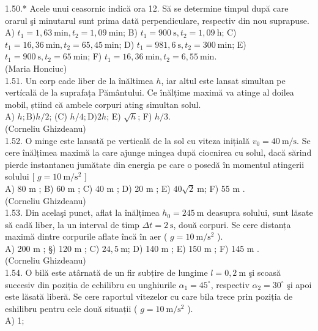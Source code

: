 \documentclass[10pt]{article}
\begin{document}
1.50.* Acele unui ceasornic indică ora 12. Să se determine timpul după care orarul şi minutarul sunt prima dată perpendiculare, respectiv din nou suprapuse.\\ A) $t_{1}=1,63 \mathrm{~min} , t_{2}=1,09 \mathrm{~min}$; B) $t_{1}=900 \mathrm{~s} , t_{2}=1,09 \mathrm{~h}$; C) $t_{1}=16,36 \mathrm{~min} , t_{2}=65,45 \mathrm{~min}$; D) $t_{1}=981,6 \mathrm{~s} , t_{2}=300 \mathrm{~min}$; E) $t_{1}=900 \mathrm{~s} , t_{2}=65 \mathrm{~min}$; F) $t_{1}=16,36 \mathrm{~min} , t_{2}=6,55 \mathrm{~min}$.\\ (Maria Honciuc)\\

1.51. Un corp cade liber de la înăltimea $h$, iar altul este lansat simultan pe vertícală de la suprafața Pământului. Ce înălțime maximă va atinge al doilea mobil, știind că ambele corpuri ating simultan solul.\\
A) $h ; \mathrm{B}) h / 2$; (C) $h / 4 ; \mathrm{D}) 2 h$; E) $\sqrt{h}$; F) $h / 3$.\\
(Corneliu Ghizdeanu)\\
1.52. O minge este lansată pe verticală de la sol cu viteza inițială $v_{0}=40 \mathrm{~m} / \mathrm{s}$. Se cere înălțimea maximă la care ajunge mingea după ciocnirea cu solul, dacă sărind pierde instantaneu jumătate din energia pe care o posedă în momentul atingerii solului [ $g=10 \mathrm{~m} / \mathrm{s}^{2}$ ]\\
A) 80 m ; B) 60 m ; C) 40 m ; D) 20 m ; E) $40 \sqrt{2} \mathrm{~m}$; F) 55 m .\\
(Corneliu Ghizdeanu)\\
1.53. Din acelaşi punct, aflat la înălțimea $h_{0}=245 \mathrm{~m}$ deasupra solului, sunt lăsate să cadă liber, la un interval de timp $\Delta t=2 \mathrm{~s}$, două corpuri. Se cere distanța maximă dintre corpurile aflate încă în aer ( $g=10 \mathrm{~m} / \mathrm{s}^{2}$ ).\\
A) 200 m ; §) 120 m ; C) $24,5 \mathrm{~m}$; D) 140 m ; E) 150 m ; F) 145 m .\\
(Corneliu Ghizdeanu)\\
1.54. O bilă este atârnată de un fir subțire de lungime $l=0,2 \mathrm{~m}$ şi scoasă succesiv din poziția de echilibru cu unghiurile $\alpha_{1}=45^{\circ}$, respectiv $\alpha_{2}=30^{\circ}$ şi apoi este lăsată liberă. Se cere raportul vitezelor cu care bila trece prin poziția de eshilibru pentru cele două situații ( $g=10 \mathrm{~m} / \mathrm{s}^{2}$ ).\\
A) 1;\\
\end{document}
